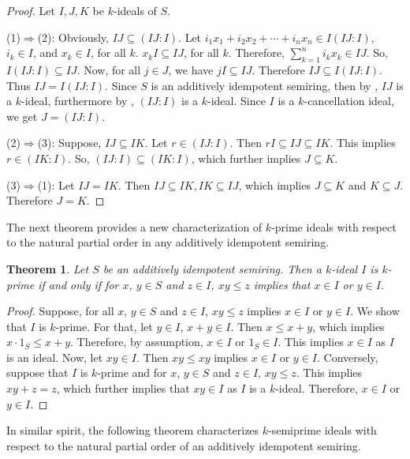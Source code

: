 \documentclass[11pt,leqno]{amsart}
\newtheorem{theorem}{Theorem}[section]
\theoremstyle{definition}
\numberwithin{equation}{section}
\begin{document}
\begin{proof}
Let $I,J,K$ be $k$-ideals of $S$.

(1)$\Rightarrow$(2): 
Obviously, $IJ\subseteq (IJ:I)$. Let $i_1x_1+i_2x_2+\cdots + i_nx_n\in I(IJ:I)$, $i_k\in I$, and $x_k\in I$, for all $k$. $x_kI\subseteq IJ$, for all $k$. Therefore, $\sum_{k=1}^n i_kx_k\in IJ$. So, $I(IJ:I)\subseteq IJ$. Now, for all $j\in J$, we have $jI\subseteq IJ$. Therefore $IJ\subseteq I(IJ:I)$. Thus $IJ=I(IJ:I)$. Since $S$ is an additively idempotent semiring, then by \cite[Lemma 3.27]{JunRayTolliver22}, $IJ$ is a $k$-ideal, furthermore by \cite[Proposition 2.4]{GoswamiDube24}, $(IJ:I)$ is a $k$-ideal.  Since $I$ is a $k$-cancellation ideal, we get $J=(IJ:I)$.

(2)$\Rightarrow$(3): 
Suppose, $IJ\subseteq IK$. Let $r\in (IJ:I)$. Then $rI\subseteq IJ\subseteq IK$. This implies $r\in (IK:I)$. So, $(IJ:I)\subseteq (IK:I)$, which further implies $J\subseteq K$.

(3)$\Rightarrow$(1):
Let $IJ=IK$. Then $IJ\subseteq IK, IK\subseteq IJ$, which implies $J\subseteq K $ and $K\subseteq J$. Therefore $J=K$.
\end{proof}
The next theorem provides a new characterization of $k$-prime ideals with respect to the natural partial order in any additively idempotent semiring.
\begin{theorem}\label{k-prime via natural partial order}
    Let $S$ be an additively idempotent semiring. Then a $k$-ideal $I$ is $k$-prime if and only if for $x$, $y \in S$ and $z \in I$, $xy \leqslant z$ implies that $x \in I$ or $y \in I$.
\end{theorem}

\begin{proof}
    Suppose, for all $x$, $y \in S$ and $z \in I$, $xy \leqslant z$ implies $x \in I$ or $y \in I$. We show that $I$ is $k$-prime. For that, let $y \in I$, $x+y \in I$. Then $x \leqslant x+y$, which implies $x\cdot1_S \leqslant x+y$. Therefore,  by assumption, $x\in I $ or $1_S \in I $. This implies $x \in I$ as $I$ is an ideal. Now, let $xy \in I$. Then $xy \leqslant xy$ implies $x \in I$ or $y \in I$. Conversely, suppose that $I$ is $k$-prime and for $x$, $y \in S$ and $z \in I$, $xy \leqslant z$. This implies $xy + z = z$, which further implies that $xy \in I$ as $I$ is a $k$-ideal. Therefore, $x \in I$ or $y \in I$.
\end{proof}

In similar spirit, the following theorem characterizes $k$-semiprime ideals with respect to the natural partial order of an additively idempotent semiring. 
\end{document}
